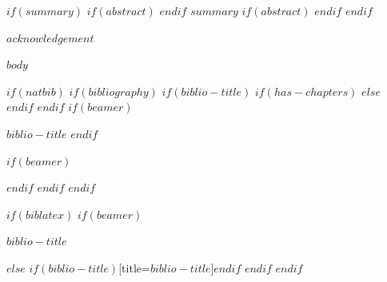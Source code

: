 \documentclass[11pt,a4paper,oneside,openright,titlepage,
  headinclude,footinclude,BCOR5mm,
  numbers=noenddot,cleardoublepage=empty,
  tablecaptionabove, dottedtoc,
  bibliography=totoc]{scrreprt}
\begin{document}
$if(summary)$
$if(abstract)$
\clearpage
$endif$
$summary$
$if(abstract)$
\endgroup
$endif$
\vfill
$endif$


\begingroup
\let\clearpage\relax
\let\cleardoublepage\relax
\let\cleardoublepage\relax


$acknowledgement$

\endgroup

\clearpage
{}
{}
\setcounter{tocdepth}{2}
\begingroup 
  \let\clearpage\relax
  \let\cleardoublepage\relax
  \tableofcontents
\endgroup
\markboth{\spacedlowsmallcaps{\contentsname}}
{\spacedlowsmallcaps{\contentsname}} 

\begingroup 
  \let\clearpage\relax
  \let\cleardoublepage\relax
\endgroup

\cleardoublepage


$body$

$if(natbib)$
$if(bibliography)$
$if(biblio-title)$
$if(has-chapters)$
\renewcommand\bibname{$biblio-title$}
$else$
\renewcommand\refname{$biblio-title$}
$endif$ %
$endif$ %
$if(beamer)$
\begin{frame}[allowframebreaks]{$biblio-title$}
  \bibliographytrue
$endif$ %
  
$if(beamer)$
\end{frame}
$endif$ %
$endif$ %
$endif$ %


$if(biblatex)$
$if(beamer)$
\begin{frame}[allowframebreaks]{$biblio-title$}
  \bibliographytrue
  \printbibliography[heading=none]
\end{frame}
$else$
\printbibliography$if(biblio-title)$[title=$biblio-title$]$endif$
$endif$ %
$endif$ %
\end{document}
